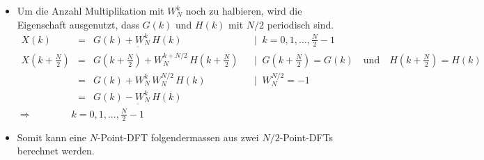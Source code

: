 \begin{itemize}
		 \item Um die Anzahl Multiplikation mit $W_N^k$ noch zu halbieren, wird die Eigenschaft ausgenutzt, dass $G(k)$ und $H(k)$ mit $N/2$ periodisch sind.\\[0.2cm]
		 $\begin{array}{lclcl}
		 X(k)& =& \underline{G(k) + W_N^{k}\,H(k)} &&\Big|\;\; k = 0,1,...,\frac{N}{2}-1\\[0.2cm]
		 X(k+\frac{N}{2})& =& G(k+\frac{N}{2}) + W_N^{k+N/2}\,H(k+\frac{N}{2}) &&\Big|\;\; G(k+\frac{N}{2}) = G(k)\quad\text{und}\quad H(k+\frac{N}{2}) = H(k)\\[0.2cm] 
 		 & =& G(k) + W_N^{k}\,W_N^{N/2}\,H(k) &&\Big|\;\; W_N^{N/2} = -1\\[0.2cm]
 		 & =& \underline{G(k) - W_N^{k}\,H(k)} &&
 		 \end{array}$\\[0.5cm]
		 $\Rightarrow\qquad$$\qquad k = 0,1,...,\frac{N}{2}-1$
		 \item Somit kann eine  $N$-Point-DFT folgendermassen aus zwei $N/2$-Point-DFTs berechnet werden.\\[0.2cm]
		 \begin{minipage}{0.6\textwidth}
\end{minipage}
\end{itemize}

